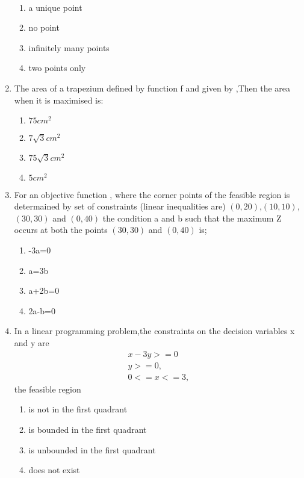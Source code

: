 \documentclass{article}
\begin{document}
\begin{enumerate}
		\\
		\begin{enumerate}[label = (\Alph*)]
			\item a unique point
			\item no point
			\item infinitely many points
			\item two points only
		\end{enumerate}
	\item The area of a trapezium  defined by function f and given by ,Then the area when it is maximised is:
		\begin{enumerate}[label=(\Alph*)]
			\item $75cm^2$
			\item $7\sqrt{3}cm^2$
			\item $75\sqrt{3}cm^2$
			\item $5cm^2$
		\end{enumerate}
	\item For an objective function , where  the corner points of the feasible region is determained by set of constraints (linear inequalities are) $(0,20)$,$(10,10)$,$(30,30)$ and $(0,40)$ the condition a and b such that the maximum Z occurs at both the points $(30,30)$ and $(0,40)$ is;
		\begin{enumerate}[label=(\Alph*)]
			\item 
				-3a=0
			\item 
				a=3b
			\item 
				a+2b=0
			\item 
				2a-b=0
		\end{enumerate}
	\item In a linear programming problem,the constraints on the decision variables x and y are 
		\begin{align}
		    x-3y>=0
		   \\ y>=0,
		   \\ 0<=x<=3,
		\end{align}
		the feasible region 
		\begin{enumerate}[label=(\Alph*)]
			\item is not in the first quadrant
			\item is bounded in the first quadrant
			\item is unbounded in the first quadrant
			\item does not exist
		\end{enumerate}
 \end{enumerate}
 
\end{document}

